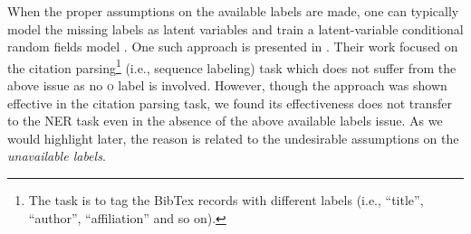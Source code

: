 When the proper assumptions on the available labels are made, one can typically model the missing labels as latent variables and train a latent-variable conditional random fields model \cite{quattoni2005conditional}.
One such approach is presented in \cite{bellare2007learning}.
Their work focused on the citation parsing\footnote{The task is to tag the BibTex records with different labels (i.e., ``title'', ``author'', ``affiliation'' and so on).} (i.e., sequence labeling) task which does not suffer from the above issue as no \textsc{o} label is involved.
However, though the approach was shown effective in the citation parsing task, we found its effectiveness does not transfer to the NER task even in the absence of the above {available labels} issue.
As we would highlight later, the reason is related to the undesirable assumptions on the {\em unavailable labels}.



